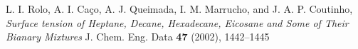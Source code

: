 \documentclass[fleqn]{scrartcl}
\begin{document}
\begin{thebibliography}{9}
 L. I. Rolo, A. I. Caço, A. J. Queimada, I. M. Marrucho, and J. A. P. Coutinho, \textit{Surface tension of Heptane, Decane, Hexadecane, Eicosane and Some of Their Bianary Mixtures} J. Chem. Eng. Data \textbf{47} (2002), 1442--1445

%
%
%
%
%
%
%
%


\end{thebibliography}
\end{document}
